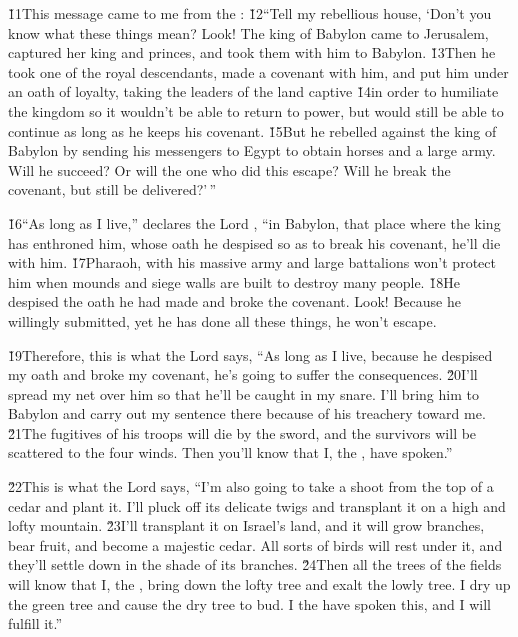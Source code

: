 \v{11}This message came to me from the : \v{12}``Tell my rebellious house, `Don't you know what these things mean? Look! The king of Babylon came to Jerusalem, captured her king and princes, and took them with him to Babylon. \v{13}Then he took one of the royal descendants, made a covenant with him, and put him under an oath of loyalty, taking the leaders of the land captive \v{14}in order to humiliate the kingdom so it wouldn't be able to return to power, but would still be able to continue as long as he keeps his covenant. \v{15}But he rebelled against the king of Babylon by sending his messengers to Egypt to obtain horses and a large army. Will he succeed? Or will the one who did this escape? Will he break the covenant, but still be delivered?'\,''

\v{16}``As long as I live,'' declares the Lord , ``in Babylon, that place where the king has enthroned him, whose oath he despised so as to break his covenant, he'll die with him. \v{17}Pharaoh, with his massive army and large battalions won't protect him when mounds and siege walls are built to destroy many people. \v{18}He despised the oath he had made and broke the covenant. Look! Because he willingly submitted, yet he has done all these things, he won't escape.

\v{19}Therefore, this is what the Lord  says, ``As long as I live, because he despised my oath and broke my covenant, he's going to suffer the consequences. \v{20}I'll spread my net over him so that he'll be caught in my snare. I'll bring him to Babylon and carry out my sentence there because of his treachery toward me. \v{21}The fugitives of his troops will die by the sword, and the survivors will be scattered to the four winds. Then you'll know that I, the , have spoken.''

\v{22}This is what the Lord  says, ``I'm also going to take a shoot from the top of a cedar and plant it. I'll pluck off its delicate twigs and transplant it on a high and lofty mountain. \v{23}I'll transplant it on Israel's land, and it will grow branches, bear fruit, and become a majestic cedar. All sorts of birds will rest under it, and they'll settle down in the shade of its branches. \v{24}Then all the trees of the fields will know that I, the , bring down the lofty tree and exalt the lowly tree. I dry up the green tree and cause the dry tree to bud. I the  have spoken this, and I will fulfill it.''

